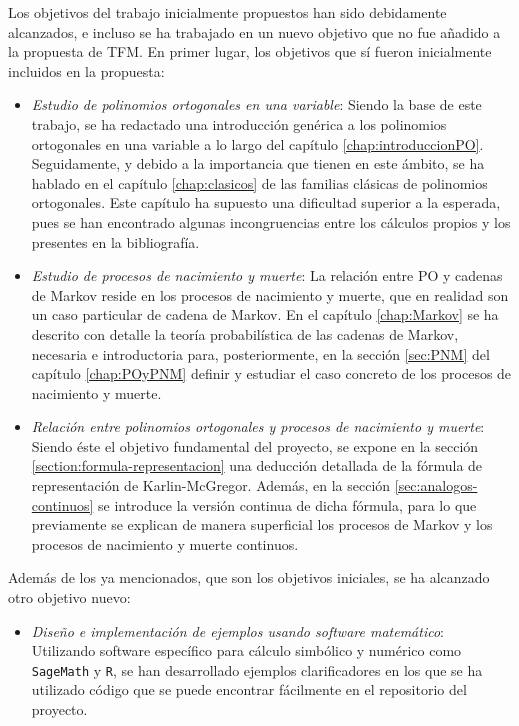Los objetivos del trabajo inicialmente propuestos han sido debidamente alcanzados, e incluso se ha trabajado en un nuevo objetivo que no fue añadido a la propuesta de TFM. En primer lugar, los objetivos que sí fueron inicialmente incluidos en la propuesta:

\begin{itemize}
    \item \textit{Estudio de polinomios ortogonales en una variable}: Siendo la base de este trabajo, se ha redactado una introducción genérica a los polinomios ortogonales en una variable a lo largo del capítulo \ref{chap:introduccionPO}. Seguidamente, y debido a la importancia que tienen en este ámbito, se ha hablado en el capítulo \ref{chap:clasicos} de las familias clásicas de polinomios ortogonales. Este capítulo ha supuesto una dificultad superior a la esperada, pues se han encontrado algunas incongruencias entre los cálculos propios y los presentes en la bibliografía.
    \item \textit{Estudio de procesos de nacimiento y muerte}: La relación entre PO y cadenas de Markov reside en los procesos de nacimiento y muerte, que en realidad son un caso particular de cadena de Markov. En el capítulo \ref{chap:Markov} se ha descrito con detalle la teoría probabilística de las cadenas de Markov, necesaria e introductoria para, posteriormente, en la sección \ref{sec:PNM} del capítulo \ref{chap:POyPNM} definir y estudiar el caso concreto de los procesos de nacimiento y muerte.
    \item \textit{Relación entre polinomios ortogonales y procesos de nacimiento y muerte}: Siendo éste el objetivo fundamental del proyecto, se expone en la sección \ref{section:formula-representacion} una deducción detallada de la fórmula de representación de Karlin-McGregor. Además, en la sección \ref{sec:analogos-continuos} se introduce la versión continua de dicha fórmula, para lo que previamente se explican de manera superficial los procesos de Markov y los procesos de nacimiento y muerte continuos.
\end{itemize}

Además de los ya mencionados, que son los objetivos iniciales, se ha alcanzado otro objetivo nuevo:
\begin{itemize}
    \item \textit{Diseño e implementación de ejemplos usando software matemático}: Utilizando software específico para cálculo simbólico y numérico como \texttt{SageMath} y \texttt{R}, se han desarrollado ejemplos clarificadores en los que se ha utilizado código que se puede encontrar fácilmente en el repositorio del proyecto.
\end{itemize}